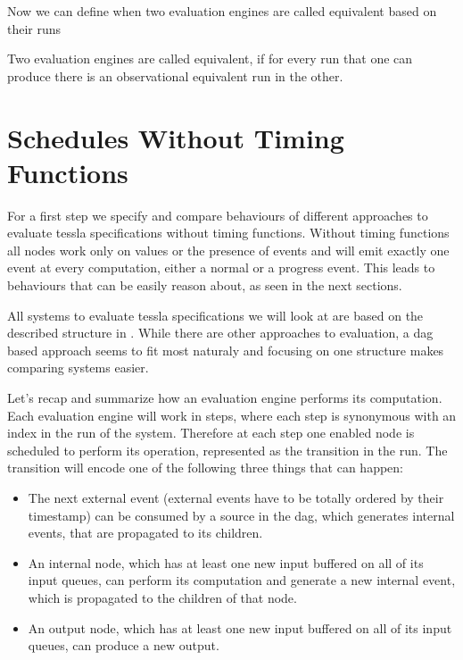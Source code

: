 Now we can define when two evaluation engines are called equivalent based on their runs

\begin{definition}[name=Equivalence of Evaluation Engines]\label{def:equivalence_eval_engine}
  Two evaluation engines are called equivalent, if for every run that one can produce there is an observational equivalent run in the other.
\end{definition}

\section{Schedules Without Timing Functions}
\label{sec:behaviours:without_timing}

For a first step we specify and compare behaviours of different approaches to evaluate \gls{tessla} specifications without timing functions.
Without timing functions all nodes work only on values or the presence of events and will emit exactly one event at every computation, either a normal or a progress event.
This leads to behaviours that can be easily reason about, as seen in the next sections.

All systems to evaluate \gls{tessla} specifications we will look at are based on the described structure in .
While there are other approaches to evaluation, a \gls{dag} based approach seems to fit most naturaly and focusing on one structure makes comparing systems easier.

Let's recap and summarize how an evaluation engine performs its computation.
Each evaluation engine will work in steps, where each step is synonymous with an index in the run of the system.
Therefore at each step one enabled node is scheduled to perform its operation, represented as the transition in the run.
The transition will encode one of the following three things that can happen:

\begin{itemize}
  \item The next external event (external events have to be totally ordered by their timestamp) can be consumed by a source in the \gls{dag}, which generates internal events, that are propagated to its children.
  \item An internal node, which has at least one new input buffered on all of its input queues, can perform its computation and generate a new internal event, which is propagated to the children of that node.
  \item An output node, which has at least one new input buffered on all of its input queues, can produce a new output.
\end{itemize}

